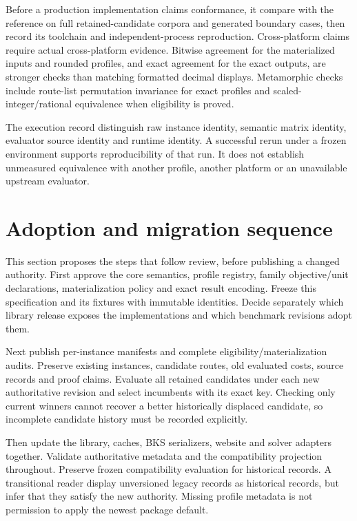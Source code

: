 Before a production implementation claims conformance, it \should{} compare with the reference on full retained-candidate corpora and generated boundary cases, then record its toolchain and independent-process reproduction. Cross-platform claims require actual cross-platform evidence. Bitwise agreement for the materialized inputs and rounded profiles, and exact agreement for the exact outputs, are stronger checks than matching formatted decimal displays. Metamorphic checks \should{} include route-list permutation invariance for exact profiles and scaled-integer/rational equivalence when eligibility is proved.

The execution record \must{} distinguish raw instance identity, semantic matrix identity, evaluator source identity and runtime identity. A successful rerun under a frozen environment supports reproducibility of that run. It does not establish unmeasured equivalence with another profile, another platform or an unavailable upstream evaluator.

\section{Adoption and migration sequence}\label{sec:migration}
This section proposes the steps that follow review, before publishing a changed authority. First approve the core semantics, profile registry, family objective/unit declarations, materialization policy and exact result encoding. Freeze this specification and its fixtures with immutable identities. Decide separately which library release exposes the implementations and which benchmark revisions adopt them.

Next publish per-instance manifests and complete eligibility/materialization audits. Preserve existing instances, candidate routes, old evaluated costs, source records and proof claims. Evaluate all retained candidates under each new authoritative revision and select incumbents with its exact key. Checking only current winners cannot recover a better historically displaced candidate, so incomplete candidate history must be recorded explicitly.

Then update the library, caches, BKS serializers, website and solver adapters together. Validate authoritative metadata and the compatibility  projection throughout. Preserve frozen compatibility evaluation for historical records. A transitional reader \may{} display unversioned legacy records as historical records, but \mustnot{} infer that they satisfy the new authority. Missing profile metadata is not permission to apply the newest package default.

